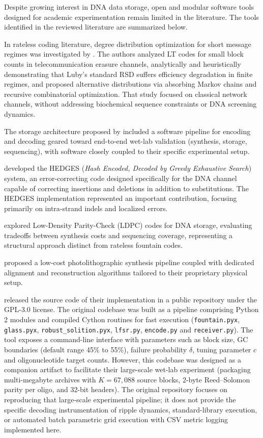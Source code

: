 Despite growing interest in DNA data storage, open and modular software tools designed for academic experimentation remain limited in the literature. The tools identified in the reviewed literature are summarized below.

In rateless coding literature, degree distribution optimization for short message regimes was investigated by . The authors analyzed LT codes for small block counts in telecommunication erasure channels, analytically and heuristically demonstrating that Luby's standard RSD suffers efficiency degradation in finite regimes, and proposed alternative distributions via absorbing Markov chains and recursive combinatorial optimization. That study focused on classical network channels, without addressing biochemical sequence constraints or DNA screening dynamics.

The storage architecture proposed by  included a software pipeline for encoding and decoding geared toward end-to-end wet-lab validation (synthesis, storage, sequencing), with software closely coupled to their specific experimental setup.

 developed the HEDGES (\emph{Hash Encoded, Decoded by Greedy Exhaustive Search}) system, an error-correcting code designed specifically for the DNA channel capable of correcting insertions and deletions in addition to substitutions. The HEDGES implementation represented an important contribution, focusing primarily on intra-strand indels and localized errors.

 explored Low-Density Parity-Check (LDPC) codes for DNA storage, evaluating tradeoffs between synthesis costs and sequencing coverage, representing a structural approach distinct from rateless fountain codes.

 proposed a low-cost photolithographic synthesis pipeline coupled with dedicated alignment and reconstruction algorithms tailored to their proprietary physical setup.

 released the source code of their implementation in a public repository under the GPL-3.0 license. The original codebase was built as a pipeline comprising Python 2 modules and compiled Cython routines for fast execution (\texttt{fountain.pyx}, \texttt{glass.pyx}, \texttt{robust\_solition.pyx}, \texttt{lfsr.py}, \texttt{encode.py} and \texttt{receiver.py}). The tool exposes a command-line interface with parameters such as block size, GC boundaries (default range 45\% to 55\%), failure probability $\delta$, tuning parameter $c$ and oligonucleotide target counts. However, this codebase was designed as a companion artifact to facilitate their large-scale wet-lab experiment (packaging multi-megabyte archives with $K = 67{,}088$ source blocks, 2-byte Reed--Solomon parity per oligo, and 32-bit headers). The original repository focuses on reproducing that large-scale experimental pipeline; it does not provide the specific decoding instrumentation of ripple dynamics, standard-library execution, or automated batch parametric grid execution with CSV metric logging implemented here.

